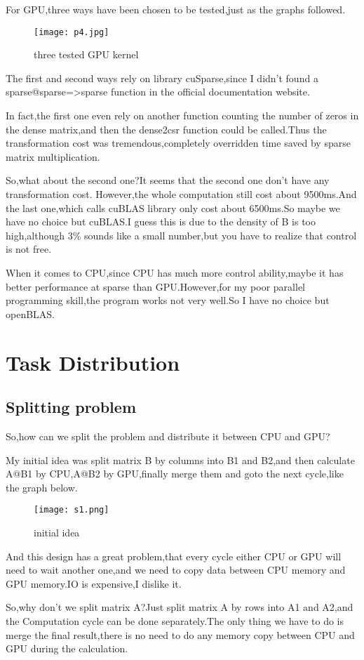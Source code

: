 \documentclass[12pt]{scrartcl} %
\begin{document}
For GPU,three ways have been chosen to be tested,just as the graphs followed.
\begin{figure}[H]
    \centering
    \texttt{[image: p4.jpg]}
    \label{}
    \caption{three tested GPU kernel}
\end{figure}
The first and second ways rely on library cuSparse,since I didn't found a sparse@sparse=>sparse function in the official documentation website.

In fact,the first one even rely on another function counting the number of zeros in the dense matrix,and then the dense2csr function could be called.Thus the transformation cost was tremendous,completely overridden time saved by sparse matrix multiplication.

So,what about the second one?It seems that the second one don't have any transformation cost. However,the whole computation still cost about 9500ms.And the last one,which calls cuBLAS library only cost about 6500ms.So maybe we have no choice but cuBLAS.I guess this is due to the density of B is too high,although 3\% sounds like a small number,but you have to realize that control is not free.

When it comes to CPU,since CPU has much more control ability,maybe it has better performance at sparse than GPU.However,for my poor parallel programming skill,the program works not very well.So I have no choice but openBLAS.
\section{Task Distribution}
\subsection{Splitting problem}
So,how can we split the problem and distribute it between CPU and GPU?

My initial idea was split matrix B by columns into B1 and B2,and then calculate A@B1 by CPU,A@B2 by GPU,finally merge them and goto the next cycle,like the graph below.
\begin{figure}[H]
    \centering
    \texttt{[image: s1.png]}
    \label{}
    \caption{initial idea}
\end{figure}

And this design has a great problem,that every cycle either CPU or GPU will need to wait another one,and we need to copy data between CPU memory and GPU memory.IO is expensive,I dislike it.

So,why don't we split matrix A?Just split matrix A by rows into A1 and A2,and the Computation cycle can be done separately.The only thing we have to do is merge the final result,there is no need to do any memory copy between CPU and GPU during the calculation.
\end{document}
